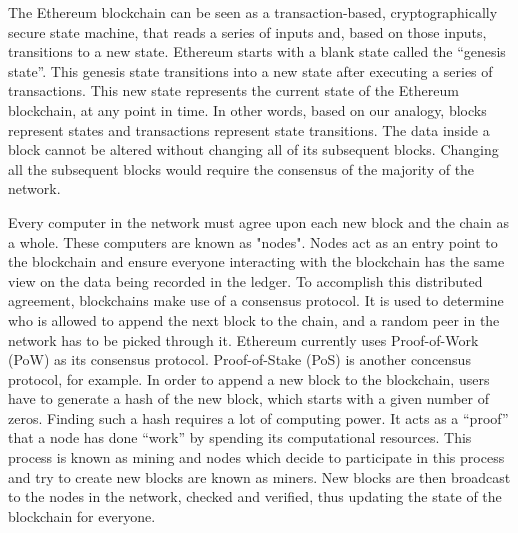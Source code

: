     The Ethereum blockchain can be seen as a transaction-based, cryptographically secure state machine, that reads a series of inputs and, based on those inputs, transitions to a new state.
    Ethereum starts with a blank state called the “genesis state”.
    This genesis state transitions into a new state after executing a series of transactions.
    This new state represents the current state of the Ethereum blockchain, at any point in time.
    In other words, based on our analogy, blocks represent states and transactions represent state transitions.
    The data inside a block cannot be altered without changing all of its subsequent blocks.
    Changing all the subsequent blocks would require the consensus of the majority of the network.

    Every computer in the network must agree upon each new block and the chain as a whole.
    These computers are known as "nodes".
    Nodes act as an entry point to the blockchain and ensure everyone interacting with the blockchain has the same view on the data being recorded in the ledger.
    To accomplish this distributed agreement, blockchains make use of a consensus protocol.
    It is used to determine who is allowed to append the next block to the chain, and a random peer in the network has to be picked through it.
    Ethereum currently uses Proof-of-Work (PoW) as its consensus protocol.
    Proof-of-Stake (PoS) is another concensus protocol, for example.
    In order to append a new block to the blockchain, users have to generate a hash of the new block, which starts with a given number of zeros.
    Finding such a hash requires a lot of computing power.
    It acts as a “proof” that a node has done “work” by spending its computational resources.
    This process is known as mining and nodes which decide to participate in this process and try to create new blocks are known as miners.
    New blocks are then broadcast to the nodes in the network, checked and verified, thus updating the state of the blockchain for everyone.

